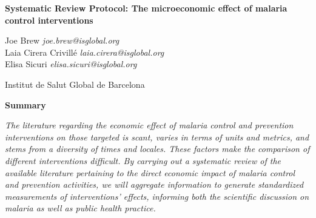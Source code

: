 \documentclass{article}
\begin{document}


\vspace{20mm}


\begin{Huge}
\begin{center}
\textbf{Systematic Review Protocol: The microeconomic effect of malaria control interventions}
\end{center}
\end{Huge}



\vspace{5mm}

\begin{changemargin}{2.5cm}{2.5cm} 
\begin{center}
\begin{large}
Joe Brew \hfill \emph{joe.brew@isglobal.org} \\
Laia Cirera Crivillé \hfill \emph{laia.cirera@isglobal.org} \\ 
Elisa Sicuri \hfill \emph{elisa.sicuri@isglobal.org} \\ 
\end{large}
\end{center}
\end{changemargin}


\vspace{6mm}

\begin{center}
\begin{large}
Institut de Salut Global de Barcelona 
\end{large}
\end{center}


\begin{changemargin}{3cm}{3cm} 

\begin{center}
\textbf{Summary}
\end{center}

\emph{The literature regarding the economic effect of malaria control and prevention interventions on those targeted is scant, varies in terms of units and metrics, and stems from a diversity of times and locales. These factors make the comparison of different interventions difficult. By carrying out a systematic review of the available literature pertaining to the direct economic impact of malaria control and prevention activities, we will aggregate information to generate standardized measurements of interventions' effects, informing both the scientific discussion on malaria as well as public health practice.}

\end{changemargin}
\end{document}

